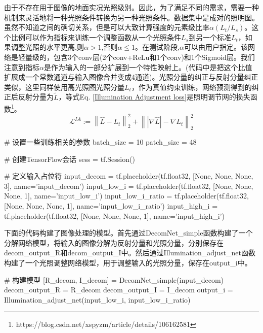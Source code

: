 \documentclass[letterpaper,12pt]{article}
\begin{document}
				由于不存在用于图像的地面实况光照级别。因此，为了满足不同的需求，需要一种机制来灵活地将一种光照条件转换为另一种光照条件。数据集中是成对的照明图。虽然不知道之间的确切关系，但是可以大致计算强度的元素级比率$\alpha(L_t / L_s)$。这个比例可以作为指标来训练一个调整函数从一个光照条件$L_s$到另一个标准$L_t$，如果调整光照的水平更高,则$\alpha>1$,否则$\alpha \le 1$。在测试阶段,$\alpha$可以由用户指定。该网络是轻量级的，包含3个conv层(2个conv+ReLu和1个conv)和1个Sigmoid层。我们注意到指标$\alpha$是作为输入的一部分扩展到一个特性映射上。(代码中是把这个比值扩展成一个常数通道与输入图像合并变成4通道)。光照分量的纠正与反射分量纠正类似，这里同样使用高光照图光照分量$L_t$，作为真值约束训练，网络预测得到的纠正后反射分量为$\tilde{L}$，等式Eq. \ref{Illumination Adjustment loss}是照明调节网的损失函数\footnote{https://blog.csdn.net/xspyzm/article/details/106162581}。
				\begin{equation}
					\mathcal{L}^{IA}:={\left\| \hat{L}-L_{t} \right\|}^{2}_{2} + {\left\| \left|\nabla\hat{L}\right|-\nabla L_{t} \right\|}^{2}_{2}
					\label{Illumination Adjustment loss}
				\end{equation}
			
			\begin{python}
			# 设置一些训练相关的参数
			batch_size = 10
			patch_size = 48
			
			# 创建TensorFlow会话
			sess = tf.Session()
			
			# 定义输入占位符
			input_decom = tf.placeholder(tf.float32, [None, None, None, 3], name='input_decom')
			input_low_i = tf.placeholder(tf.float32, [None, None, None, 1], name='input_low_i')
			input_low_i_ratio = tf.placeholder(tf.float32, [None, None, None, 1], name='input_low_i_ratio')
			input_high_i = tf.placeholder(tf.float32, [None, None, None, 1], name='input_high_i')
			\end{python}
		
			下面的代码构建了图像处理的模型。首先通过DecomNet\_simple函数构建了一个分解网络模型，将输入的图像分解为反射分量和光照分量，分别保存在decom\_output\_R和decom\_output\_I中。然后通过Illumination\_adjust\_net函数构建了一个光照调整网络模型，用于调整输入的光照分量，保存在output\_i中。
			
			\begin{python}
			# 构建模型
			[R_decom, I_decom] = DecomNet_simple(input_decom)
			decom_output_R = R_decom
			decom_output_I = I_decom
			output_i = Illumination_adjust_net(input_low_i, input_low_i_ratio)
			\end{python}
			
\end{document}
